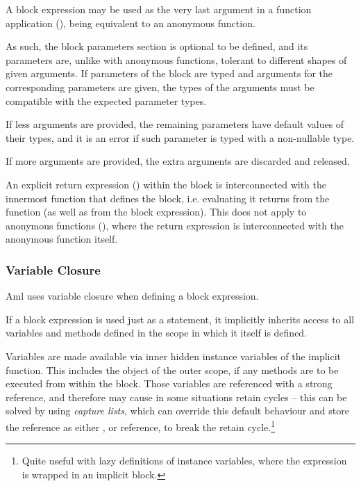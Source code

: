 A block expression may be used as the very last argument in a function application (), being equivalent to an anonymous function. 

As such, the block parameters section is optional to be defined, and its parameters are, unlike with anonymous functions, tolerant to different shapes of given arguments. If parameters of the block are typed and arguments for the corresponding parameters are given, the types of the arguments must be compatible with the expected parameter types. 

If less arguments are provided, the remaining parameters have default values of their types, and it is an error if such parameter is typed with a non-nullable type. 

If more arguments are provided, the extra arguments are discarded and released. 

An explicit return expression () within the block is interconnected with the innermost function that defines the block, i.e. evaluating it returns from the function (as well as from the block expression). This does not apply to anonymous functions (), where the return expression is interconnected with the anonymous function itself. 






\subsubsection{Variable Closure}
\label{sec:variable-closure}

Aml uses variable closure when defining a block expression. 

If a block expression is used just as a statement, it implicitly inherits access to all variables and methods defined in the scope in which it itself is defined. 

Variables are made available via inner hidden instance variables of the implicit function. This includes the  object of the outer scope, if any methods are to be executed from within the block. Those variables are referenced with a strong reference, and therefore may cause in some situations retain cycles -- this can be solved by using {\em capture lists}, which can override this default behaviour and store the reference as either ,  or  reference, to break the retain cycle.\footnote{Quite useful with lazy definitions of instance variables, where the expression is wrapped in an implicit block.} 

